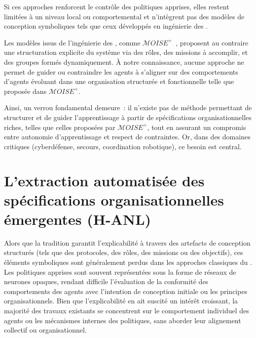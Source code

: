 \medskip

\noindent
Si ces approches renforcent le contrôle des politiques apprises, elles restent limitées à un niveau local ou comportemental et n'intègrent pas des modèles de conception symboliques tels que ceux développés en ingénierie des .

\medskip

\noindent
Les modèles issus de l'ingénierie des , comme \textit{$\mathcal{M}OISE^+$}~\cite{hubner2002moise}, proposent au contraire une structuration explicite du système via des rôles, des missions à accomplir, et des groupes formés dynamiquement. À notre connaissance, aucune approche ne permet de guider ou contraindre les agents à s'aligner sur des comportements d'agents évoluant dans une organisation structurée et fonctionnelle telle que proposée dans $\mathcal{M}OISE^+$.

\medskip

\noindent
Ainsi, un verrou fondamental demeure~: il n'existe pas de méthode permettant de structurer et de guider l'apprentissage  à partir de spécifications organisationnelles riches, telles que celles proposées par $\mathcal{M}OISE^+$, tout en assurant un compromis entre autonomie d'apprentissage et respect de contraintes. Or, dans des domaines critiques (cyberdéfense, secours, coordination robotique), ce besoin est central.


\section{L'extraction automatisée des spécifications organisationnelles émergentes (H-ANL)}

Alors que la tradition  garantit l'explicabilité à travers des artefacts de conception structurés (tels que des protocoles, des rôles, des missions ou des objectifs), ces éléments symboliques sont généralement perdus dans les approches classiques du . Les politiques apprises sont souvent représentées sous la forme de réseaux de neurones opaques, rendant difficile l'évaluation de la conformité des comportements des agents avec l'intention de conception initiale ou les principes organisationnels. Bien que l'explicabilité en  ait suscité un intérêt croissant, la majorité des travaux existants se concentrent sur le comportement individuel des agents ou les mécanismes internes des politiques, sans aborder leur alignement collectif ou organisationnel.

